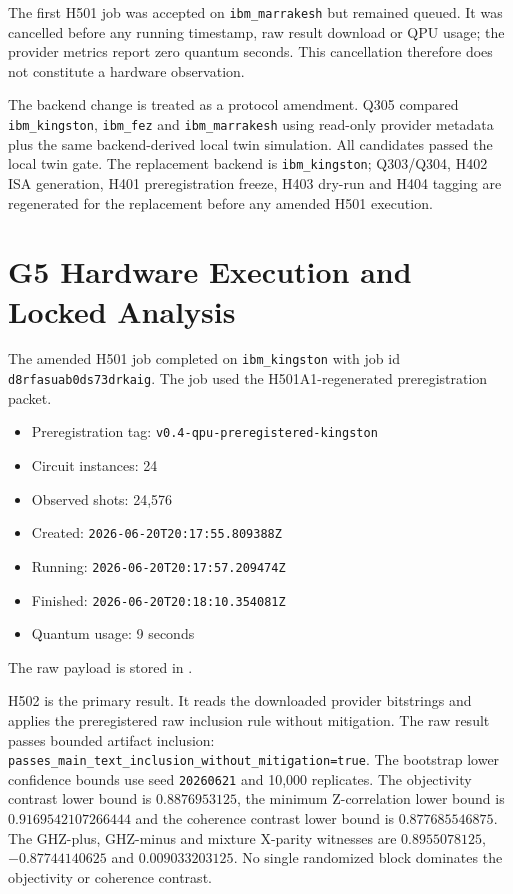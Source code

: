 \documentclass[11pt]{article}
\begin{document}
The first H501 job was accepted on \texttt{ibm\_marrakesh} but remained queued.
It was cancelled before any running timestamp, raw result download or QPU usage;
the provider metrics report zero quantum seconds. This cancellation therefore
does not constitute a hardware observation.

The backend change is treated as a protocol amendment. Q305 compared
\texttt{ibm\_kingston}, \texttt{ibm\_fez} and \texttt{ibm\_marrakesh} using
read-only provider metadata plus the same backend-derived local twin simulation.
All candidates passed the local twin gate. The replacement backend is
\texttt{ibm\_kingston}; Q303/Q304, H402 ISA generation, H401 preregistration
freeze, H403 dry-run and H404 tagging are regenerated for the replacement before
any amended H501 execution.

\section{G5 Hardware Execution and Locked Analysis}

The amended H501 job completed on \texttt{ibm\_kingston} with job id
\texttt{d8rfasuab0ds73drkaig}. The job used the H501A1-regenerated
preregistration packet.
\begin{itemize}
  \item Preregistration tag: \texttt{v0.4-qpu-preregistered-kingston}
  \item Circuit instances: 24
  \item Observed shots: 24,576
\end{itemize}
\begin{itemize}
  \item Created: \texttt{2026-06-20T20:17:55.809388Z}
  \item Running: \texttt{2026-06-20T20:17:57.209474Z}
  \item Finished: \texttt{2026-06-20T20:18:10.354081Z}
  \item Quantum usage: 9 seconds
\end{itemize}
The raw payload is stored in
.

H502 is the primary result. It reads the downloaded provider bitstrings and
applies the preregistered raw inclusion rule without mitigation. The raw result
passes bounded artifact inclusion:
\texttt{passes\_main\_text\_inclusion\_without\_mitigation=true}. The
bootstrap lower confidence bounds use seed \texttt{20260621} and 10,000
replicates. The objectivity contrast lower bound is
\(0.8876953125\), the minimum Z-correlation lower bound is
\(0.9169542107266444\) and the coherence contrast lower bound is
\(0.877685546875\). The GHZ-plus, GHZ-minus and mixture X-parity witnesses are
\(0.8955078125\), \(-0.87744140625\) and \(0.009033203125\). No single
randomized block dominates the objectivity or coherence contrast.
\end{document}
